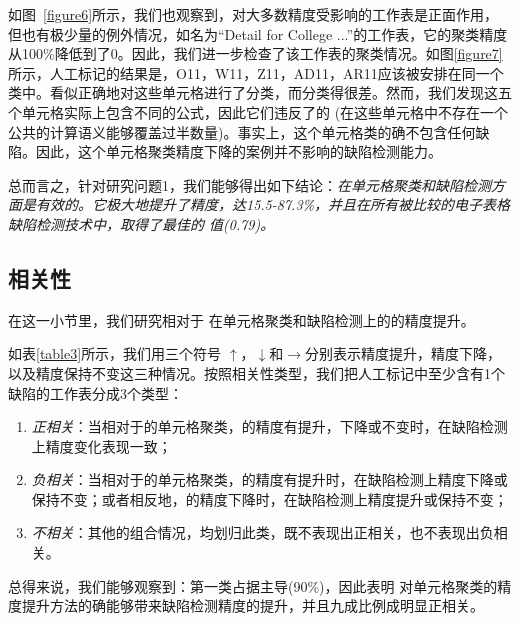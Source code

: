 


如图~\ref{figure6}所示，我们也观察到，\wa 对大多数精度受影响的工作表是正面作用，但也有极少量的例外情况，如名为“Detail for College ...”的工作表，它的聚类精度从100\%降低到了0。因此，我们进一步检查了该工作表的聚类情况。如图\ref{figure7}所示，人工标记的结果是，{O11，W11，Z11，AD11，AR11}应该被安排在同一个类中。\cu 看似正确地对这些单元格进行了分类，而\wa 分类得很差。然而，我们发现这五个单元格实际上包含不同的公式，因此它们违反了\wa 的 \wcvp (在这些单元格中不存在一个公共的计算语义能够覆盖过半数量)。事实上，这个单元格类的确不包含任何缺陷。因此，这个单元格聚类精度下降的案例并不影响\wa 的缺陷检测能力。

总而言之，针对研究问题1，我们能够得出如下结论：\textit{\wa 在单元格聚类和缺陷检测方面是有效的。它极大地提升了精度，达15.5-87.3\%，并且在所有被比较的电子表格缺陷检测技术中，取得了最佳的 \fmd 值(0.79)。}

\subsection{相关性}



在这一小节里，我们研究\wa 相对于 \cu 在单元格聚类和缺陷检测上的的精度提升。

如表\ref{table3}所示，我们用三个符号 $\uparrow$，$\downarrow$和$\to$分别表示精度提升，精度下降，以及精度保持不变这三种情况。按照相关性类型，我们把人工标记中至少含有1个缺陷的工作表分成3个类型：
\begin{enumerate}
    \item \textit{正相关}：当相对于\cu 的单元格聚类，\wa 的精度有提升，下降或不变时，在缺陷检测上精度变化表现一致；
    \item \textit{负相关}：当相对于\cu 的单元格聚类，\wa 的精度有提升时，在缺陷检测上精度下降或保持不变；或者相反地，\wa 的精度下降时，在缺陷检测上精度提升或保持不变；
    \item \textit{不相关}：其他的组合情况，均划归此类，既不表现出正相关，也不表现出负相关。
\end{enumerate}
总得来说，我们能够观察到：第一类占据主导(90\%)，因此表明 \wa 对单元格聚类的精度提升方法的确能够带来缺陷检测精度的提升，并且九成比例成明显正相关。




